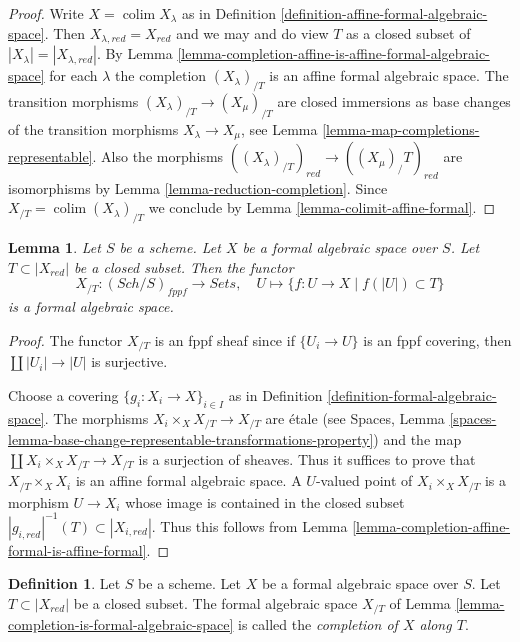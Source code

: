 \documentclass{stacks-project}
\theoremstyle{plain}
\newtheorem{lemma}[subsection]{Lemma}
\theoremstyle{definition}
\newtheorem{definition}[subsection]{Definition}
\theoremstyle{remark}
\numberwithin{equation}{subsection}
\def\colim{\mathop{\mathrm{colim}}\nolimits}
\def\Sch{\mathit{Sch}}
\begin{document}
\begin{proof}
Write $X = \colim X_\lambda$ as in
Definition \ref{definition-affine-formal-algebraic-space}.
Then $X_{\lambda, red} = X_{red}$ and we may and do view
$T$ as a closed subset of $|X_\lambda| = |X_{\lambda, red}|$.
By Lemma \ref{lemma-completion-affine-is-affine-formal-algebraic-space}
for each $\lambda$ the completion
$(X_\lambda)_{/T}$ is an affine formal algebraic space.
The transition morphisms $(X_\lambda)_{/T} \to (X_\mu)_{/T}$ are
closed immersions as base changes of the transition morphisms
$X_\lambda \to X_\mu$, see Lemma \ref{lemma-map-completions-representable}.
Also the morphisms $((X_\lambda)_{/T})_{red} \to ((X_\mu)_/T)_{red}$
are isomorphisms by Lemma \ref{lemma-reduction-completion}.
Since $X_{/T} = \colim (X_\lambda)_{/T}$ we conclude
by Lemma \ref{lemma-colimit-affine-formal}.
\end{proof}

\begin{lemma}
\label{lemma-completion-fas-is-fas}
Let $S$ be a scheme. Let $X$ be a formal algebraic space over $S$.
Let $T \subset |X_{red}|$ be a closed subset. Then the functor
$$
X_{/T} : (\Sch/S)_{fppf} \longrightarrow \textit{Sets},\quad
U \longmapsto \{f : U \to X \mid f(|U|) \subset T\}
$$
is a formal algebraic space.
\end{lemma}

\begin{proof}
The functor $X_{/T}$ is an fppf sheaf since if
$\{U_i \to U\}$ is an fppf covering, then
$\coprod |U_i| \to |U|$ is surjective.

\medskip\noindent
Choose a covering $\{g_i : X_i \to X\}_{i \in I}$ as in Definition
\ref{definition-formal-algebraic-space}.
The morphisms $X_i \times_X X_{/T} \to X_{/T}$ are \'etale
(see Spaces, Lemma
\ref{spaces-lemma-base-change-representable-transformations-property})
and the map $\coprod X_i \times_X X_{/T} \to X_{/T}$ is a surjection of
sheaves. Thus it suffices to prove that $X_{/T} \times_X X_i$
is an affine formal algebraic space. A $U$-valued point of
$X_i \times_X X_{/T}$ is a morphism $U \to X_i$ whose image is
contained in the closed subset
$|g_{i, red}|^{-1}(T) \subset |X_{i, red}|$. Thus this follows from
Lemma \ref{lemma-completion-affine-formal-is-affine-formal}.
\end{proof}

\begin{definition}
\label{definition-completion-formal-algebraic-space}
Let $S$ be a scheme. Let $X$ be a formal algebraic space over $S$.
Let $T \subset |X_{red}|$ be a closed subset. The formal algebraic space
$X_{/T}$ of Lemma \ref{lemma-completion-is-formal-algebraic-space}
is called the {\it completion of $X$ along $T$}.
\end{definition}
\end{document}
